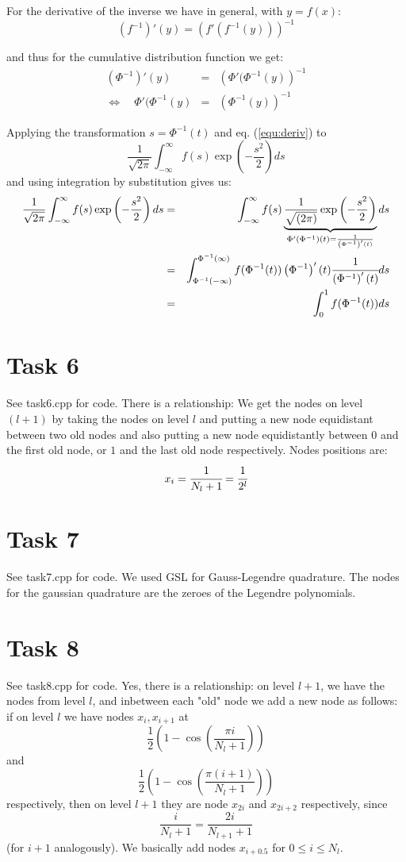 \documentclass[]{article}
\begin{document}
For the derivative of the inverse we have in general, with $y = f(x)$:
\[\left(f^{-1}\right)'(y) = \left(f'\left(f^{-1}(y)\right)\right)^{-1}\]

and thus for the cumulative distribution function we get:
\begin{eqnarray}
\left(\Phi^{-1}\right)'(y) & = &
\left(\Phi'(\Phi^{-1}(y)\right)^{-1} \nonumber\\
\Leftrightarrow \quad \Phi'(\Phi^{-1}(y) & = & \left(\Phi^{-1}(y)\right)^{-1}
\label{equ:deriv}
\end{eqnarray}

Applying the transformation $s = \Phi^{-1}(t)$ and eq. (\ref{equ:deriv}) to 
\[\dfrac{1}{\sqrt{2\pi}}\int_{-\infty}^{\infty}f(s)\exp\left({-\dfrac{s^2}{2}}\right)ds\]
and using integration by substitution gives us:
\begin{eqnarray*}
\dfrac{1}{\sqrt{2\pi}}\int_{-\infty}^{\infty}f(s)\exp\left({-\dfrac{s^2}{2}}\right)ds
& = &
\int_{-\infty}^{\infty}f(s)\underbrace{\dfrac{1}{\sqrt{(2\pi)}}\exp\left({-\dfrac{s^2}{2}}\right)}_{\Phi'(\Phi^{-1})(t)
= \frac{1}{\left(\Phi^{-1}\right)'(t)}}ds \\
& =
&\int_{\Phi^{-1}(-\infty)}^{\Phi^{-1}(\infty)}f(\Phi^{-1}(t))\left(\Phi^{-1}\right)'(t)\cfrac{1}{\left(\Phi^{-1}\right)'(t)}ds
\\
& = &
\int_{0}^{1}f(\Phi^{-1}(t))ds
\end{eqnarray*}

\section*{Task 6} See task6.cpp for code. There is a relationship: We get the
nodes on level $(l+1)$ by taking the nodes on level $l$ and putting a new node
equidistant between two old nodes and also putting a new node equidistantly
between $0$ and the first old node, or $1$ and the last old node respectively.
Nodes positions are:
\begin{eqnarray*}
x_i = \cfrac{1}{N_l+1} = \cfrac{1}{2^l}
\end{eqnarray*}

\section*{Task 7}
See task7.cpp for code. We used GSL for Gauss-Legendre quadrature. The nodes for
the gaussian quadrature are the zeroes of the Legendre polynomials.

\clearpage
\section*{Task 8} See task8.cpp for code. Yes, there is a relationship: on level
$l+1$, we have the nodes from level $l$, and inbetween each "old" node we add a
new node as follows: if on level $l$ we have nodes $x_i,x_{i+1}$ at
\[ \dfrac{1}{2}\left(1-\cos\left(\dfrac{\pi i}{N_l+1}\right)\right)\]
 and
\[\dfrac{1}{2}\left(1-\cos\left(\dfrac{\pi(i+1)}{N_l+1}\right)\right)\]
 respectively, then on level $l+1$ they are node $x_{2i}$ and $x_{2i+2}$ respectively, since
\[\dfrac{i}{N_l+1}=\dfrac{2i}{N_{l+1}+1}\]
 (for $i+1$ analogously). We basically add nodes  $x_{i+0.5}$ for $0\le i \le
 N_l$.
\end{document}
